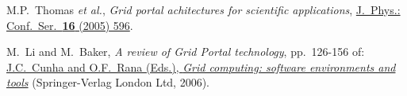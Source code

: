 \documentclass{elsart}
\def\etal {\textit{et al.}}
\begin{document}
\begin{thebibliography}{00}
 M.P.~Thomas \etal,
\textit{Grid portal achitectures for scientific applications},
\href{http://dx.doi.org/10.1088/1742-6596/16/1/083}
{J.~Phys.: Conf.\ Ser.\ \textbf{16} (2005) 596}.

 M.~Li and M.~Baker,
\textit{A review of Grid Portal technology}, pp.~126-156 of:
\href{http://www.springer.com/computer/programming/book/978-1-85233-998-2}
{J.C.~Cunha and O.F.~Rana (Eds.),
\textit{Grid computing: software environments and tools}}
(Springer-Verlag London Ltd, 2006).




\end{thebibliography}
\end{document}
